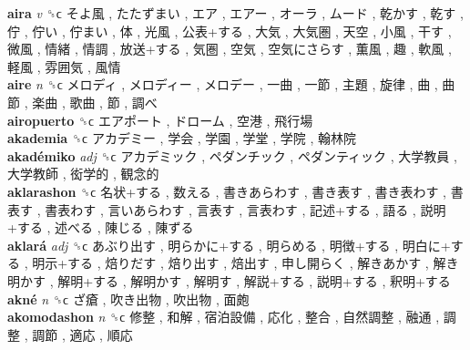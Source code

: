\textbf{aira} \emph{v}  ␝ϲ   そよ風 ,  たたずまい ,  エア ,  エアー ,  オーラ ,  ムード ,  乾かす ,  乾す ,  佇 ,  佇い ,  佇まい ,  体 ,  光風 ,  公表+する ,  大気 ,  大気圏 ,  天空 ,  小風 ,  干す ,  微風 ,  情緒 ,  情調 ,  放送+する ,  気圏 ,  空気 ,  空気にさらす ,  薫風 ,  趣 ,  軟風 ,  軽風 ,  雰囲気 ,  風情   \\
\textbf{aire} \emph{n}  ␝ϲ   メロディ ,  メロディー ,  メロデー ,  一曲 ,  一節 ,  主題 ,  旋律 ,  曲 ,  曲節 ,  楽曲 ,  歌曲 ,  節 ,  調べ   \\
\textbf{airopuerto} ␝ϲ   エアポート ,  ドローム ,  空港 ,  飛行場   \\
\textbf{akademia} ␝ϲ   アカデミー ,  学会 ,  学園 ,  学堂 ,  学院 ,  翰林院   \\
\textbf{akadémiko} \emph{adj}  ␝ϲ   アカデミック ,  ペダンチック ,  ペダンティック ,  大学教員 ,  大学教師 ,  衒学的 ,  観念的   \\
\textbf{aklarashon} ␝ϲ   名状+する ,  数える ,  書きあらわす ,  書き表す ,  書き表わす ,  書表す ,  書表わす ,  言いあらわす ,  言表す ,  言表わす ,  記述+する ,  語る ,  説明+する ,  述べる ,  陳じる ,  陳ずる   \\
\textbf{aklará} \emph{adj}  ␝ϲ   あぶり出す ,  明らかに+する ,  明らめる ,  明徴+する ,  明白に+する ,  明示+する ,  焙りだす ,  焙り出す ,  焙出す ,  申し開らく ,  解きあかす ,  解き明かす ,  解明+する ,  解明かす ,  解明す ,  解説+する ,  説明+する ,  釈明+する   \\
\textbf{akné} \emph{n}  ␝ϲ   ざ瘡 ,  吹き出物 ,  吹出物 ,  面皰   \\
\textbf{akomodashon} \emph{n}  ␝ϲ   修整 ,  和解 ,  宿泊設備 ,  応化 ,  整合 ,  自然調整 ,  融通 ,  調整 ,  調節 ,  適応 ,  順応   \\
